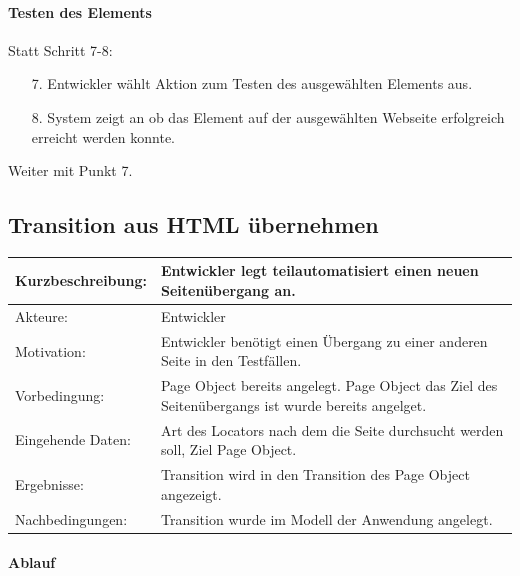 \paragraph{Testen des Elements}
Statt Schritt 7-8:
\begin{itemize}
\item[7.] Entwickler wählt Aktion zum Testen des ausgewählten Elements aus. 
\item[8.] System zeigt an ob das Element auf der ausgewählten Webseite erfolgreich erreicht werden konnte. 
\end{itemize}
Weiter mit Punkt 7. 

\subsection{Transition aus HTML übernehmen}
\label{sec:Transition_from_html}

\begin{tabular}[h]{|p{4cm}|p{}|}
\hline 
\rule[-1ex]{0pt}{2.5ex}Kurzbeschreibung: & 
Entwickler legt teilautomatisiert einen neuen Seitenübergang an. \\  
\hline 
\rule[-1ex]{0pt}{2.5ex}Akteure: & 
Entwickler \\ 
\hline 
\rule[-1ex]{0pt}{2.5ex}Motivation: & 
Entwickler benötigt einen Übergang zu einer anderen Seite in den Testfällen. \\ 
\hline 
\rule[-1ex]{0pt}{2.5ex}Vorbedingung: & 
Page Object bereits angelegt. Page Object das Ziel des Seitenübergangs ist wurde bereits angelget. \\ 
\hline 
\rule[-1ex]{0pt}{2.5ex}Eingehende Daten: & Art des Locators nach dem die Seite durchsucht werden soll, Ziel Page Object. \\ 
\hline 
\rule[-1ex]{0pt}{2.5ex}Ergebnisse: & Transition wird in den Transition des Page Object angezeigt. \\ 
\hline 
\rule[-1ex]{0pt}{2.5ex}Nachbedingungen: & Transition wurde im Modell der Anwendung angelegt.  \\ 
\hline 
\end{tabular} 

\paragraph{Ablauf}

